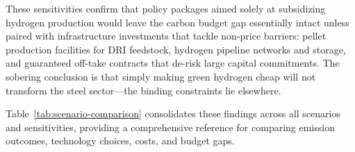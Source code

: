 These sensitivities confirm that policy packages aimed solely at subsidizing hydrogen production would leave the carbon budget gap essentially intact unless paired with infrastructure investments that tackle non-price barriers: pellet production facilities for DRI feedstock, hydrogen pipeline networks and storage, and guaranteed off-take contracts that de-risk large capital commitments. The sobering conclusion is that simply making green hydrogen cheap will not transform the steel sector—the binding constraints lie elsewhere.

Table~\ref{tab:scenario-comparison} consolidates these findings across all scenarios and sensitivities, providing a comprehensive reference for comparing emission outcomes, technology choices, costs, and budget gaps.
